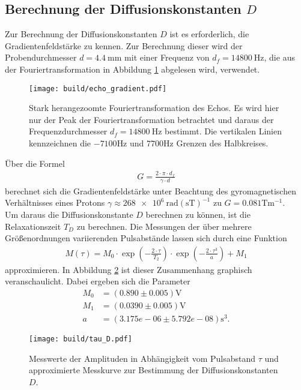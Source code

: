 \subsection{Berechnung der Diffusionskonstanten $D$}
\noindent Zur Berechnung der Diffusionskonstanten $D$ ist es erforderlich, die
Gradientenfeldstärke zu kennen. Zur Berechnung dieser wird der Probendurchmesser
$d = \SI{4.4}{\milli\meter}$ mit einer Frequenz von $d_f = \SI{14800}{\hertz}$, die aus der Fouriertransformation in Abbildung \ref{fig:d_f} abgelesen wird, verwendet. 
\begin{figure}
  \texttt{[image: build/echo\_gradient.pdf]}
  \caption{Stark herangezoomte Fouriertransformation des Echos. Es wird hier nur der Peak der Fouriertransformation betrachtet und daraus der Frequenzdurchmesser $d_f = \SI{14800}{\hertz}$ bestimmt. Die vertikalen Linien kennzeichnen die $-7100\si{\hertz}$ und $7700\si{\hertz}$ Grenzen des Halbkreises.}
  \label{fig:d_f}
\end{figure}
Über die Formel
\begin{align}
  G = \frac{2 \cdot \pi \cdot d_f}{\gamma \cdot d}
  \label{eqn:05}
\end{align}
\noindent berechnet sich die Gradientenfeldstärke unter Beachtung des
gyromagnetischen Verhältnisses eines Protons $\gamma \approx \num{268e6} \:
\text{rad}(\si{\second\tesla})^{-1}$ zu
$G = \num{0.081} {\si{\tesla}}{\si{\meter}^{-1}}$. \\
\noindent Um daraus die Diffusionskonstante $D$ berechnen zu können, ist die
Relaxationszeit $T_D$ zu berechnen. Die Messungen der über mehrere
Größenordnungen variierenden Pulsabstände lassen sich durch eine Funktion
\begin{align}
  M(\tau) = M_0 \cdot \exp{\left(- \frac{2 \cdot \tau}{T_2}\right)} \cdot \exp{\left(- \frac{2 \cdot \tau^3}{a}\right)} + M_1
 \label{eqn:06}
\end{align}
\noindent approximieren. In Abbildung \ref{fig:03} ist dieser Zusammenhang
graphisch veranschaulicht. Dabei ergeben sich die Parameter
\begin{align*}
  M_0 &=  (0.890  \pm  0.005)          \si{\volt} \\
  M_1 &=  (0.0390  \pm  0.005)         \si{\volt} \\
  a &=  (3.175e-06  \pm  5.792e-08) \si{\second^3}.
\end{align*}
\FloatBarrier
\begin{figure}
  \texttt{[image: build/tau\_D.pdf]}
  \caption{Messwerte der Amplituden in Abhängigkeit vom Pulsabstand $\tau$ und
  approximierte Messkurve zur Bestimmung der Diffusionskonstanten $D$.}
  \label{fig:03}
\end{figure}
